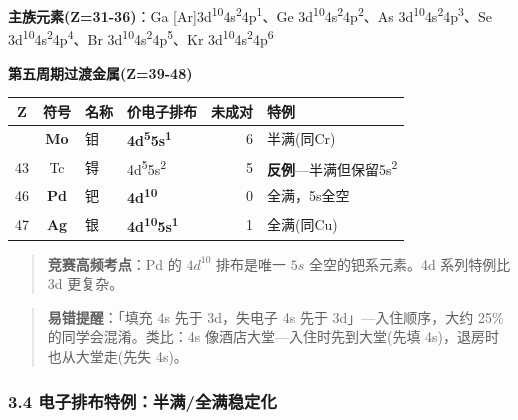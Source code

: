 \textbf{主族元素(Z=31-36)}：Ga {[}Ar{]}3d\textsuperscript{10}4s\textsuperscript{2}4p\textsuperscript{1}、Ge 3d\textsuperscript{10}4s\textsuperscript{2}4p\textsuperscript{2}、As 3d\textsuperscript{10}4s\textsuperscript{2}4p\textsuperscript{3}、Se 3d\textsuperscript{10}4s\textsuperscript{2}4p\textsuperscript{4}、Br 3d\textsuperscript{10}4s\textsuperscript{2}4p\textsuperscript{5}、Kr 3d\textsuperscript{10}4s\textsuperscript{2}4p\textsuperscript{6}

\textbf{第五周期过渡金属(Z=39-48)}

{\def\LTcaptype{none} %
\begin{longtable}[]{@{}ccllrl@{}}
\toprule\noalign{}
Z & 符号 & 名称 & 价电子排布 & 未成对 & 特例 \\
\midrule\noalign{}
\endhead
\bottomrule\noalign{}
\endlastfoot
42 & \textbf{Mo} & 钼 & \textbf{4d\textsuperscript{5}5s\textsuperscript{1}} & 6 & 半满(同Cr) \\
43 & Tc & 锝 & 4d\textsuperscript{5}5s\textsuperscript{2} & 5 & \textbf{反例}---半满但保留5s\textsuperscript{2} \\
46 & \textbf{Pd} & 钯 & \textbf{4d\textsuperscript{10}} & 0 & 全满，5s全空 \\
47 & \textbf{Ag} & 银 & \textbf{4d\textsuperscript{10}5s\textsuperscript{1}} & 1 & 全满(同Cu) \\
\end{longtable}
}

\begin{quote}
\textbf{竞赛高频考点}：Pd 的 \(4d^{10}\) 排布是唯一 \(5s\) 全空的钯系元素。4d 系列特例比 3d 更复杂。
\end{quote}

\begin{quote}
\textbf{易错提醒}：「填充 4s 先于 3d，失电子 4s 先于 3d」---入住顺序，大约 25\% 的同学会混淆。类比：4s 像酒店大堂---入住时先到大堂(先填 4s)，退房时也从大堂走(先失 4s)。
\end{quote}

\subsubsection{3.4 电子排布特例：半满/全满稳定化}\label{ux7535ux5b50ux6392ux5e03ux7279ux4f8bux534aux6ee1ux5168ux6ee1ux7a33ux5b9aux5316}

